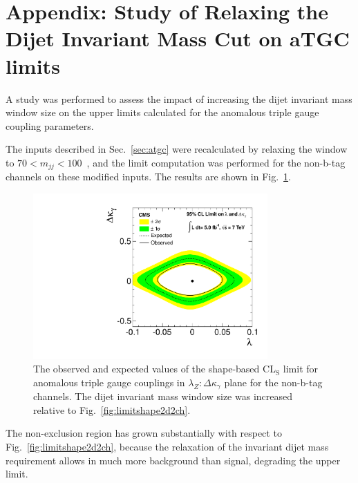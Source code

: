 \section{Appendix: Study of Relaxing the Dijet Invariant Mass Cut on aTGC limits}
\label{sec:afmufsucrosschecks}

A study was performed to assess the impact of increasing the dijet invariant mass
window size on the upper limits calculated for the anomalous triple gauge coupling
parameters.

The inputs described in Sec.~\ref{sec:atgc} were recalculated by
relaxing the window to $70 < m_{jj} < 100$~\GeV, and the limit
computation was performed for the non-b-tag channels on these modified
inputs. The results are shown in Fig.~\ref{fig:atgc2dlim_largemjjwin}.

\begin{figure}[bthp]
\includegraphics[width=0.8\textwidth]{figs/lz_dkg_2dlimit_largemjjwin.pdf}
\caption{\label{fig:atgc2dlim_largemjjwin} The observed and expected
values of the shape-based CL${}_{\textrm{S}}$ limit for anomalous
triple gauge couplings in $\lambda_Z:\Delta{\kappa_\gamma}$ plane for
the non-b-tag channels. The dijet invariant mass window size was
increased relative to Fig.~\ref{fig:limitshape2d2ch}.  }
\end{figure}

The non-exclusion region has grown substantially with respect to
Fig.~\ref{fig:limitshape2d2ch}, because the relaxation of the invariant
dijet mass requirement allows in much more background than signal, 
degrading the upper limit.

\clearpage
